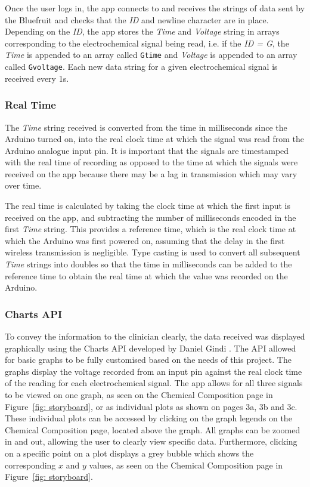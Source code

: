 Once the user logs in, the app connects to and receives the strings of data sent by the Bluefruit and checks that the \textit{ID} and newline character are in place. Depending on the \textit{ID}, the app stores the \textit{Time} and \textit{Voltage} string in arrays corresponding to the electrochemical signal being read, i.e. if the \textit{ID = G}, the \textit{Time} is appended to an array called  {\tt{Gtime}} and \textit{Voltage} is appended to an array called {\tt{Gvoltage}}. Each new data string for a given electrochemical signal is received every 1s. 

\subsubsection{Real Time} \label{section: real time}
The \textit{Time} string received is converted from the time in milliseconds since the Arduino turned on, into the real clock time at which the signal was read from the Arduino analogue input pin. It is important that the signals are timestamped with the real time of recording as opposed to the time at which the signals were received on the app because there may be a lag in transmission which may vary over time.

The real time is calculated by taking the clock time at which the first input is received on the app, and subtracting the number of milliseconds encoded in the first \textit{Time} string. This provides a reference time, which is the real clock time at which the Arduino was first powered on, assuming that the delay in the first wireless transmission is negligible. Type casting is used to convert all subsequent \textit{Time} strings into doubles so that the time in milliseconds can be added to the reference time to obtain the real time at which the value was recorded on the Arduino.


\subsubsection{Charts API}
To convey the information to the clinician clearly, the data received was displayed graphically using the Charts API developed by Daniel Gindi \cite{Charts}. The API allowed for basic graphs to be fully customised based on the needs of this project. The graphs display the voltage recorded from an input pin against the real clock time of the reading for each electrochemical signal. The app allows for all three signals to be viewed on one graph, as seen on the Chemical Composition page in Figure~\ref{fig: storyboard}, or as individual plots as shown on pages 3a, 3b and 3c. These individual plots can be accessed by clicking on the graph legends on the Chemical Composition page, located above the graph. All graphs can be zoomed in and out, allowing the user to clearly view specific data. Furthermore, clicking on a specific point on a plot displays a grey bubble which shows the corresponding $x$ and $y$ values, as seen on the Chemical Composition page in Figure~\ref{fig: storyboard}.



